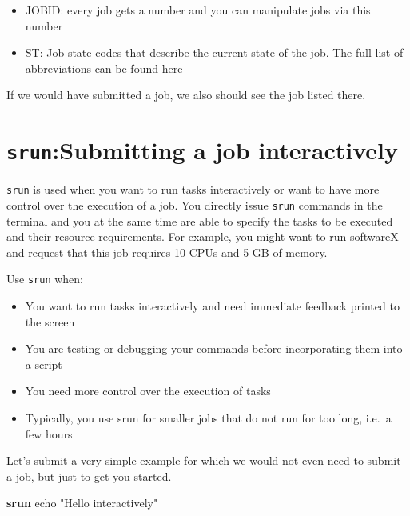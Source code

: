 \documentclass[
  letterpaper,
  DIV=11,
  numbers=noendperiod]{scrreprt}
\newenvironment{Shaded}{}{}
\newcommand{\ExtensionTok}[1]{\textcolor[rgb]{0.84,0.23,0.29}{\textbf{#1}}}
\newcommand{\NormalTok}[1]{\textcolor[rgb]{0.14,0.16,0.18}{#1}}
\newcommand{\StringTok}[1]{\textcolor[rgb]{0.01,0.18,0.38}{#1}}
\providecommand{\tightlist}{%
  \setlength{\itemsep}{0pt}\setlength{\parskip}{0pt}}\usepackage{longtable,booktabs,array}
\begin{document}
\begin{itemize}
\tightlist
\item
  JOBID: every job gets a number and you can manipulate jobs via this
  number
\item
  ST: Job state codes that describe the current state of the job. The
  full list of abbreviations can be found
  \href{https://curc.readthedocs.io/en/latest/running-jobs/squeue-status-codes.html}{here}
\end{itemize}

If we would have submitted a job, we also should see the job listed
there.

\section{\texorpdfstring{\texttt{srun}:Submitting a job
interactively}{srun:Submitting a job interactively}}\label{srunsubmitting-a-job-interactively}

\texttt{srun} is used when you want to run tasks interactively or want
to have more control over the execution of a job. You directly issue
\texttt{srun} commands in the terminal and you at the same time are able
to specify the tasks to be executed and their resource requirements. For
example, you might want to run softwareX and request that this job
requires 10 CPUs and 5 GB of memory.

Use \texttt{srun} when:

\begin{itemize}
\tightlist
\item
  You want to run tasks interactively and need immediate feedback
  printed to the screen
\item
  You are testing or debugging your commands before incorporating them
  into a script
\item
  You need more control over the execution of tasks
\item
  Typically, you use srun for smaller jobs that do not run for too long,
  i.e.~a few hours
\end{itemize}

Let's submit a very simple example for which we would not even need to
submit a job, but just to get you started.

\begin{Shaded}
\begin{Highlighting}[]
\ExtensionTok{srun}\NormalTok{ echo }\StringTok{"Hello interactively"}
\end{Highlighting}
\end{Shaded}
\end{document}
